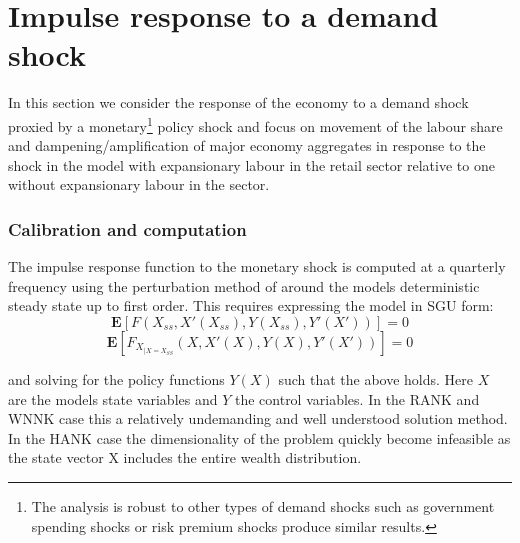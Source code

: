 \documentclass[12pt]{article}
\begin{document}
\section{Impulse response to a demand shock}

In this section we consider the response of the economy to a demand shock proxied by a monetary\footnote{The analysis is robust to other types of demand shocks such as government spending shocks or risk premium shocks produce similar results.} policy shock and focus on movement of the labour share and dampening/amplification of major economy aggregates in response to the shock in the model with expansionary labour in the retail sector relative to one without expansionary labour in the sector. 


\subsubsection{Calibration and computation}

The impulse response function to the monetary shock is computed at a quarterly frequency using the perturbation method of \cite{schmitt2004solving} around the models deterministic steady state up to first order. This requires expressing the model in SGU form:
\begin{equation}
\mathbf{E}\left[F(X_{ss},X'(X_{ss}),Y(X_{ss}),Y'(X'))\right]=0
\label{eq:sgu1}
\end{equation}
\begin{equation}
\mathbf{E}\left[F_{X_{|X=X_{SS}}}(X,X'(X),Y(X),Y'(X'))\right]=0
\label{eq:sgu2}
\end{equation}

and solving for the policy functions $Y(X)$ such that the above holds. Here $X$ are the models state variables and $Y$ the control variables. In the RANK and WNNK case this a relatively undemanding and well understood solution method. In the HANK case the dimensionality of the problem quickly become infeasible as the state vector X includes the entire wealth distribution. 
\end{document}
